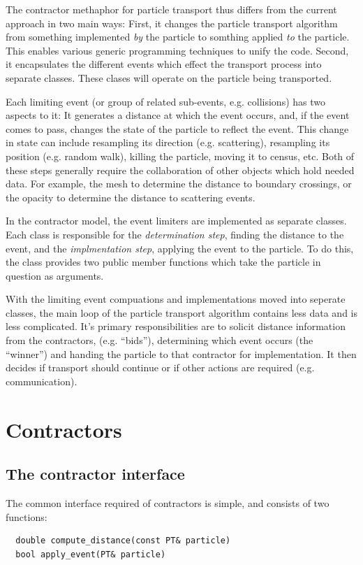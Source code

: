 \documentclass[memo]{ResearchNote}
\begin{document}
The contractor methaphor for particle transport thus differs from the
current approach in two main ways: First, it changes the particle
transport algorithm from something implemented {\em by} the particle
to somthing applied {\em to} the particle. This enables various
generic programming techniques to unify the code.  Second, it
encapsulates the different events which effect the transport process
into separate classes. These clases will operate on the particle being
transported.

Each limiting event (or group of related sub-events, e.g. collisions)
has two aspects to it: It generates a distance at which the event
occurs, and, if the event comes to pass, changes the state of the
particle to reflect the event. This change in state can include
resampling its direction (e.g. scattering), resampling its position
(e.g. random walk), killing the particle, moving it to census, etc.
Both of these steps generally require the collaboration of other
objects which hold needed data. For example, the mesh to determine the
distance to boundary crossings, or the opacity to determine the
distance to scattering events.

In the contractor model, the event limiters are implemented as
separate classes. Each class is responsible for the {\em determination
  step}, finding the distance to the event, and the {\em implmentation
  step}, applying the event to the particle. To do this, the class
provides two public member functions which take the particle in
question as arguments.

With the limiting event compuations and implementations moved into
seperate classes, the main loop of the particle transport algorithm
contains less data and is less complicated. It's primary
responsibilities are to solicit distance information from the
contractors, (e.g. ``bids''), determining which event occurs (the
``winner'') and handing the particle to that contractor for
implementation. It then decides if transport should continue or if
other actions are required (e.g. communication).

\section{Contractors}

\subsection{The contractor interface}

The common interface required of contractors is simple, and consists
of two functions:
\begin{verbatim}
  double compute_distance(const PT& particle)
  bool apply_event(PT& particle)
\end{verbatim}
\end{document}
